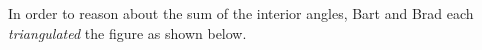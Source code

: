 \documentclass[nooutcomes]{ximera}
\begin{document}
\begin{problem}
In order to reason about the sum of the interior angles, Bart and Brad each \emph{triangulated} the figure as shown below.  

%

\end{problem}
\end{document}
